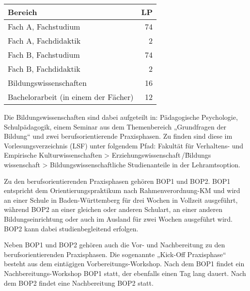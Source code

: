 \begin{table}[htb]
	\begin{tabular*}{\linewidth}{lr}
		\toprule
		Bereich & \gls{LP}\\
		\midrule
		Fach A, Fachstudium & 74\\
		Fach A, Fachdidaktik & \phantom{0}2\\
		\addlinespace
		Fach B, Fachstudium & 74\\
		Fach B, Fachdidaktik & \phantom{0}2\\
		\addlinespace
		Bildungswissenschaften & 16\\
		\addlinespace
		Bachelorarbeit (in einem der Fächer) & 12\\
		\bottomrule
	\end{tabular*}
	\vspace{-4mm}
\end{table}


Die Bildungswissenschaften sind dabei aufgeteilt in: Pä\-da\-go\-gische Psychologie, Schulpädagogik, einem Seminar aus dem Themenbereich „Grundfragen der Bildung“ und  zwei berufsorientierende Praxisphasen. Zu finden sind diese im Vorlesungsverzeichnis (LSF) unter folgendem Pfad:
Fakultät für Verhaltens- und Empirische Kulturwissenschaften > Erziehungs\-wissenschaft\,/\.  Bildungs\,wissenschaft > Bildungswissenschaftliche Studienanteile in der Lehramtsoption.


Zu den berufsorientierenden Praxisphasen gehören BOP1 und BOP2. BOP1 entspricht dem Orientierungspraktikum nach Rahmenverordnung-KM und wird an einer Schule in Baden-Württemberg für drei Wochen in Vollzeit ausgeführt, während BOP2 an einer gleichen oder anderen Schulart, an einer anderen Bildungseinrichtung oder auch im Ausland für zwei Wochen ausgeführt wird. BOP2 kann dabei studienbegleitend erfolgen.

Neben \gls{BOP}1 und \gls{BOP}2 gehören auch die Vor- und Nachbereitung zu den berufsorientierenden Praxisphasen. Die sogenannte „Kick-Off Praxisphase“ besteht aus dem eintägigen Vorbereitungs-Workshop. Nach dem BOP1 findet ein Nachbereitungs-Workshop BOP1 statt, der ebenfalls einen Tag lang dauert. Nach dem BOP2 findet eine Nachbereitung BOP2 statt.

